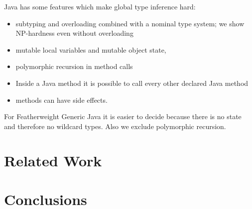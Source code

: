 \documentclass[runningheads]{llncs}
\begin{document}
Java has some features which make global type inference hard:
\begin{itemize}
\item subtyping and overloading combined with a nominal type system;
  we show NP-hardness even without overloading
\item mutable local variables and mutable object state,
\item polymorphic recursion in method calls
\item Inside a Java method it is possible to call every other declared Java method
\item methods can have side effects.
\end{itemize}


For Featherweight Generic Java it is easier to decide because there is no state and therefore no wildcard types.
Also we exclude polymorphic recursion.


\section{Related Work}


\section{Conclusions}
\label{sec:conclusions}




\end{document}

